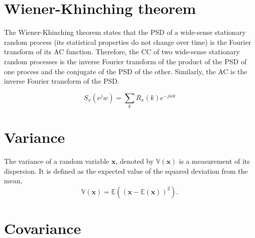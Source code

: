 \section{Wiener-Khinching theorem}
\label{sec:WKT}

The Wiener-Khinching theorem states that the \gls{PSD} of a wide-sense
stationary random process (its statistical properties do not change
over time) is the Fourier transform of its \gls{AC}
function. Therefore, the \gls{CC} of two wide-sense stationary random
processes is the inverse Fourier transform of the product of the
\gls{PSD} of one process and the conjugate of the \gls{PSD} of the
other. Similarly, the \gls{AC} is the inverse Fourier transform
of the \gls{PSD}.

\begin{equation}
  S_x(e^jw)=\sum_kR_x(k)e^{-jwk}
\end{equation}


\section{Variance}
\label{sec:variance}

The variance of a random variable $\mathbf{x}$, denoted by
$\mathbb{V}(\mathbf{x})$ is a measurement of its dispersion. It is
defined as the expected value of the squared deviation from the mean,
\begin{equation}
  \mathbb{V}(\mathbf{x}) = \mathbb{E}\left((\mathbf{x} - \mathbb{E}(\mathbf{x}))^2 \right).
  \label{eq:variance}
\end{equation}


\section{Covariance}
\label{sec:covariance}

